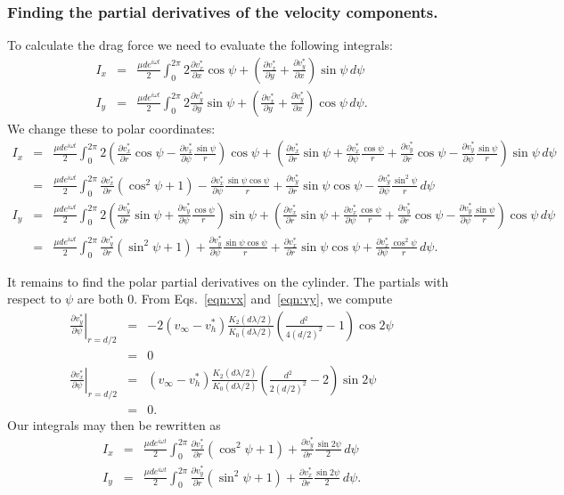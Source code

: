 \documentclass[11pt]{amsart}
\newcommand{\vinf}{v_{\infty}}
\newcommand{\om}{\omega}
\newcommand{\baas}[1]{\begin{eqnarray*} #1 \end{eqnarray*}}
\newcommand{\pd}[2]{\ensuremath{\frac{\partial #1}{\partial #2}}}
\begin{document}
	\subsubsection{Finding the partial derivatives of the velocity components.} To calculate the drag force we need to evaluate the following integrals:
	\baas{
	 I_x &=& \frac{\mu d e^{i \om t}}{2}\int_0^{2\pi} 2\pd{v_x^*}{x}\cos\psi + \left( \pd{v_x^*}{y} + \pd{v_y^*}{x} \right)\sin \psi \, d\psi \\
	 I_y &=& \frac{\mu d e^{i \om t}}{2}\int_0^{2\pi} 2\pd{v_y^*}{y}\sin\psi + \left( \pd{v_x^*}{y} + \pd{v_y^*}{x} \right)\cos \psi \, d\psi.
	}
	We change these to polar coordinates:
	\baas{
	I_x &=& \frac{\mu d e^{i \om t}}{2}\int_0^{2\pi} 2\left( \pd{v_x^*}{r}\cos\psi - \pd{v_x^*}{\psi}\frac{\sin\psi}{r} \right)\cos\psi + \left( \pd{v_x^*}{r}\sin\psi + \pd{v_x^*}{\psi}\frac{\cos\psi}{r} + \pd{v_y^*}{r}\cos\psi - \pd{v_y^*}{\psi}\frac{\sin\psi}{r}  \right)\sin \psi \, d\psi \\
	&=& \frac{\mu d e^{i \om t}}{2}\int_0^{2\pi} \pd{v_x^*}{r} (\cos^2\psi+1) - \pd{v_x^*}{\psi}\frac{\sin\psi\cos\psi}{r} + \pd{v_y^*}{r}\sin\psi\cos\psi - \pd{v_y^*}{\psi}\frac{\sin^2\psi}{r} \, d\psi \\
	I_y &=& \frac{\mu d e^{i \om t}}{2}\int_0^{2\pi} 2\left( \pd{v_y^*}{r}\sin\psi + \pd{v_y^*}{\psi}\frac{\cos\psi}{r} \right)\sin\psi + \left( \pd{v_x^*}{r}\sin\psi + \pd{v_x^*}{\psi}\frac{\cos\psi}{r} + \pd{v_y^*}{r}\cos\psi - \pd{v_y^*}{\psi}\frac{\sin\psi}{r}  \right)\cos \psi \, d\psi \\
	&=& \frac{\mu d e^{i \om t}}{2}\int_0^{2\pi} \pd{v_y^*}{r}(\sin^2\psi+1) + \pd{v_y^*}{\psi}\frac{\sin\psi\cos\psi}{r} + \pd{v_x^*}{r} \sin\psi\cos\psi + \pd{v_x^*}{\psi}\frac{\cos^2\psi}{r} \, d\psi.
	}
	
	It remains to find the polar partial derivatives on the cylinder. The partials with respect to $\psi$ are both 0. From Eqs.~\eqref{eqn:vx} and~\eqref{eqn:vy}, we compute
	\baas{
	\left . \pd{v_y^*}{\psi}\right\vert_{r=d/2} &=& - 2 (\vinf-v_h^*)\frac{K_2(d\lambda/2)}{K_0(d\lambda/2)}\left( \frac{d^2}{4(d/2)^2} -1 \right)\cos2\psi \\
	&=& 0 \\
	\left . \pd{v_x^*}{\psi}\right\vert_{r=d/2} &=& (\vinf-v_h^*)\frac{K_2(d\lambda/2)}{K_0(d\lambda/2)}\left(\frac{d^2}{2(d/2)^2} -2 \right)\sin2\psi \\
	&=& 0.
	}
	Our integrals may then be rewritten as
	\baas{
	I_x &=& \frac{\mu d e^{i \om t}}{2}\int_0^{2\pi} \pd{v_x^*}{r} (\cos^2\psi+1) + \pd{v_y^*}{r}\frac{\sin 2\psi}{2}  \, d\psi \\
	I_y &=& \frac{\mu d e^{i \om t}}{2}\int_0^{2\pi} \pd{v_y^*}{r}(\sin^2\psi+1) + \pd{v_x^*}{r} \frac{\sin 2\psi}{2} \, d\psi.
	}
	
\end{document}
